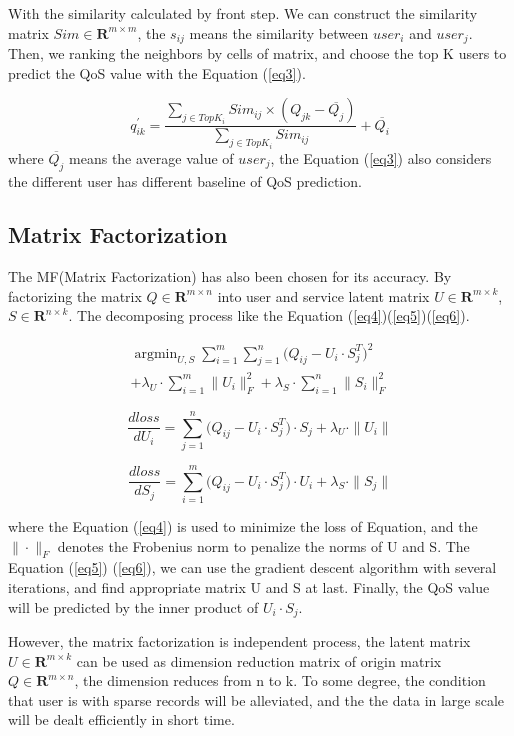 \documentclass[conference]{IEEEtran}
\begin{document}
\par With the similarity calculated by front step. We can construct the similarity matrix $Sim \in \textbf{R}^{m\times m}$, the $s_{ij}$ means the similarity between $user_{i}$ and $user_{j}$. Then, we ranking the neighbors by cells of matrix, and choose the top K users to predict the QoS value with the Equation (\ref{eq3}).

\begin{equation}
q^{'}_{ik}=\frac{
  \sum_{j \in TopK_{i}}{Sim_{ij} \times (Q_{jk}-\overline{Q_{j}})}
  }{
  \sum_{j \in TopK_{i}}{Sim_{ij}}
}+\overline{Q_{i}} 
\label{eq3}
\end{equation}
where $\overline{Q_{j}}$ means the average value of $user_{j}$, the Equation (\ref{eq3}) also considers the different user has different baseline of QoS prediction. 

\subsection{Matrix Factorization}
The MF(Matrix Factorization) has also been chosen for its accuracy. By factorizing the matrix $Q\in \textbf{R}^{m \times n} $ into user and service latent matrix $U\in \textbf{R}^{m \times k}$, $S \in \textbf{R}^{n \times k}$. The decomposing process like  the Equation (\ref{eq4})(\ref{eq5})(\ref{eq6}).

\begin{equation}
\begin{aligned}
\mathop{\arg\min}_{U,S} \sum_{i=1}^{m}{\sum_{j=1}^{n}{
(Q_{ij}-U_{i} \cdot S_{j}^{T}})^{2}
} \\
+ \lambda_{U} \cdot \sum_{i=1}^{m}\|U_{i}\|_{F}^{2}
+ \lambda_{S} \cdot \sum_{i=1}^{n}\|S_{i}\|_{F}^{2}
\label{eq4}
\end{aligned}
\end{equation}

\begin{equation}
{\frac{dloss}{dU_{i}}={\sum_{j=1}^{n}{
(Q_{ij}-U_{i} \cdot S_{j}^{T}}) \cdot S_{j}
} 
+ \lambda_{U} \cdot \|U_{i}\|
\label{eq5}
} 
\end{equation}

\begin{equation}
\frac{dloss}{dS_{j}}={\sum_{i=1}^{m}{
(Q_{ij}-U_{i} \cdot S_{j}^{T}}) \cdot U_{i}
}
+ \lambda_{S} \cdot \|S_{j}\|
\label{eq6}
\end{equation}

where the Equation (\ref{eq4}) is used to minimize the loss of Equation, and the $\| \cdot \|_{F}$ denotes the Frobenius norm to penalize the norms of U and S. The Equation (\ref{eq5}) (\ref{eq6}), we can use the gradient descent algorithm with several iterations, and find appropriate matrix U and S at last. Finally, the QoS value will be predicted by the inner product of $U_{i} \cdot S_{j}$. 
\par However, the matrix factorization is independent process, the latent matrix $U \in \textbf{R}^{m \times k}$ can be used as dimension reduction matrix of origin matrix $Q \in \textbf{R}^{m \times n}$, the dimension reduces from n to k. To some degree, the condition that user is with sparse records will be alleviated, and the the data in large scale will be dealt efficiently in short time.
\end{document}
